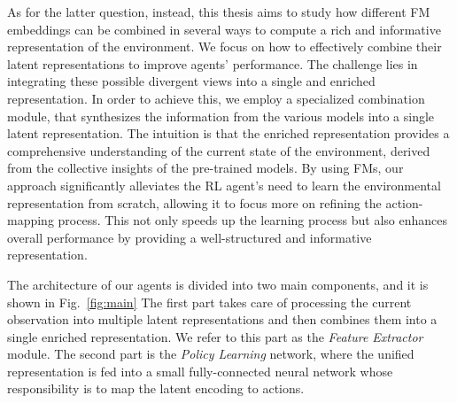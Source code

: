 As for the latter question, instead, this thesis aims to study how different FM embeddings can be combined in several ways to compute a rich and informative representation of the environment.
We focus on how to effectively combine their latent representations to improve agents' performance.
The challenge lies in integrating these possible divergent views into a single and enriched representation.
In order to achieve this, we employ a specialized combination module, that synthesizes the information from the various models into a single latent representation.
The intuition is that the enriched representation provides a comprehensive understanding of the current state of the environment, derived from the collective insights of the pre-trained models.
By using FMs, our approach significantly alleviates the RL agent's need to learn the environmental representation from scratch, allowing it to focus more on refining the action-mapping process.
This not only speeds up the learning process but also enhances overall performance by providing a well-structured and informative representation.

The architecture of our agents is divided into two main components, and it is shown in Fig.~\ref{fig:main}
The first part takes care of processing the current observation into multiple latent representations and then combines them into a single enriched representation.
We refer to this part as the \textit{Feature Extractor} module.
The second part is the \textit{Policy Learning} network, where the unified representation is fed into a small fully-connected neural network whose responsibility is to map the latent encoding to actions.


